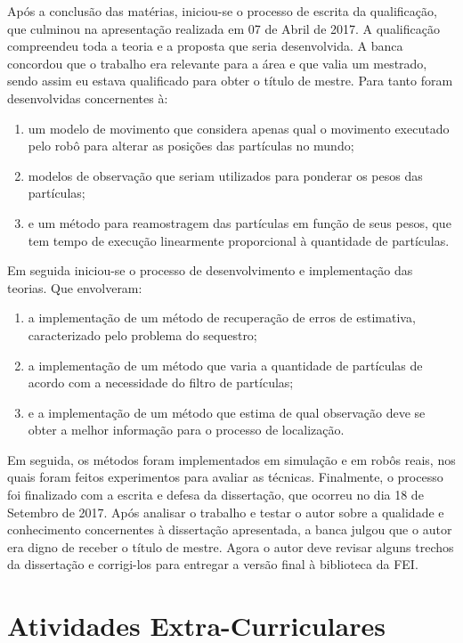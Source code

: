 \documentclass[
  12pt,       %
  oneside,
  a4paper,      %
  english,      %
  french,       %
  spanish,      %
  brazil,       %
  ]{abntex2}
\begin{document}
Após a conclusão das matérias, iniciou-se o processo de escrita da qualificação, que culminou na apresentação realizada em 07 de Abril de 2017.
A qualificação compreendeu toda a teoria e a proposta que seria desenvolvida.
A banca concordou que o trabalho era relevante para a área e que valia um mestrado, sendo assim eu estava qualificado para obter o título de mestre.
Para tanto foram desenvolvidas concernentes à:
%
\begin{enumerate}
  \item um modelo de movimento que considera apenas qual o movimento executado pelo robô para alterar as posições das partículas no mundo;

  \item modelos de observação que seriam utilizados para ponderar os pesos das partículas;

  \item e um método para reamostragem das partículas em função de seus pesos, que tem tempo de execução linearmente proporcional à quantidade de partículas.
\end{enumerate}

Em seguida iniciou-se o processo de desenvolvimento e implementação das teorias.
Que envolveram:
%
\begin{enumerate}
  \item a implementação de um método de recuperação de erros de estimativa, caracterizado pelo problema do sequestro;

  \item a implementação de um método que varia a quantidade de partículas de acordo com a necessidade do filtro de partículas;

  \item e a implementação de um método que estima de qual observação deve se obter a melhor informação para o processo de localização.
\end{enumerate}
%
Em seguida, os métodos foram implementados em simulação e em robôs reais, nos quais foram feitos experimentos para avaliar as técnicas.
Finalmente, o processo foi finalizado com a escrita e defesa da dissertação, que ocorreu no dia 18 de Setembro de 2017.
Após analisar o trabalho e testar o autor sobre a qualidade e conhecimento concernentes à dissertação apresentada, a banca julgou que o autor era digno de receber o título de mestre.
Agora o autor deve revisar alguns trechos da dissertação e corrigi-los para entregar a versão final à biblioteca da FEI.

\section{Atividades Extra-Curriculares}\label{sec:extra}
\end{document}
